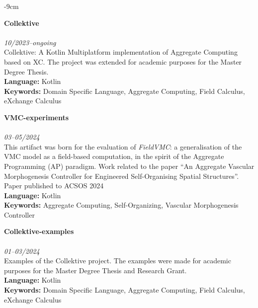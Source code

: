 \documentclass[10pt,a4paper]{altacv}
\begin{document}

\begin{adjustwidth}{}{-9cm}

    \textbf{Collektive}\\
    \\
    \textit{10/2023--ongoing}\\ \smallskip
    Collektive: A Kotlin Multiplatform implementation of Aggregate Computing based on XC. The project was extended for academic purposes for the Master Degree Thesis.\\ \smallskip
    \smallskip
    \textbf{Language:} Kotlin\\
    \textbf{Keywords:} Domain Specific Language, Aggregate Computing, Field Calculus, eXchange Calculus

    \divider

    \textbf{VMC-experiments}\\
    \\
    \textit{03--05/2024}\\ \smallskip
    This artifact was born for the evaluation of \emph{FieldVMC}: a generalisation of the VMC model as a field-based computation, 
    in the spirit of the Aggregate Programming (AP) paradigm.
    Work related to the paper ``An Aggregate Vascular Morphogenesis Controller for Engineered Self-Organising Spatial Structures''.\\ \smallskip
    {\small \notesymbol \hspace{0.5em} Paper published to ACSOS 2024}\\
    \smallskip
    \textbf{Language:} Kotlin\\
    \textbf{Keywords:} Aggregate Computing, Self-Organizing, Vascular Morphogenesis Controller

    \divider

    \textbf{Collektive-examples}\\
    \\
    \textit{01--03/2024}\\ \smallskip
    Examples of the Collektive project. The examples were made for academic purposes for the Master Degree Thesis and Research Grant.\\ \smallskip
    \smallskip
    \textbf{Language:} Kotlin\\
    \textbf{Keywords:} Domain Specific Language, Aggregate Computing, Field Calculus, eXchange Calculus


\end{adjustwidth}
\end{document}
